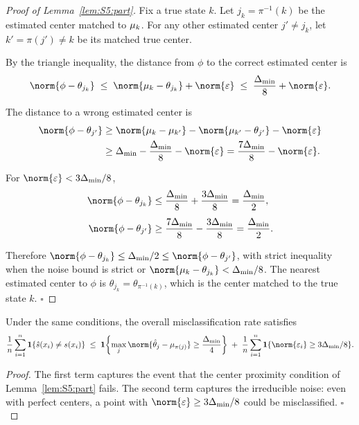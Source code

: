 \begin{proof}[Proof of Lemma~\ref{lem:S5:part}]
Fix a true state $k$.  Let $j_k=\pi^{-1}(k)$ be the estimated center
matched to $\mu_k$.  For any other estimated center $j'\neq j_k$, let
$k'=\pi(j')\neq k$ be its matched true center.

By the triangle inequality, the distance from $\phi$ to the correct
estimated center is
\[
\norm{\phi-\theta_{j_k}}
\;\le\; \norm{\muk-\theta_{j_k}} + \norm{\varepsilon}
\;\le\; \frac{\Delta_{\min}}{8} + \norm{\varepsilon}.
\]

The distance to a wrong estimated center is
\begin{align*}
\norm{\phi-\theta_{j'}}
&\ge \norm{\muk-\mu_{k'}} - \norm{\mu_{k'}-\theta_{j'}} - \norm{\varepsilon} \\
&\ge \Delta_{\min} - \frac{\Delta_{\min}}{8} - \norm{\varepsilon}
= \frac{7\Delta_{\min}}{8} - \norm{\varepsilon}.
\end{align*}

For $\norm{\varepsilon}<3\Delta_{\min}/8$,
\begin{align*}
\norm{\phi-\theta_{j_k}}
&\le \frac{\Delta_{\min}}{8} + \frac{3\Delta_{\min}}{8}
= \frac{\Delta_{\min}}{2}, \\[4pt]
\norm{\phi-\theta_{j'}}
&\ge \frac{7\Delta_{\min}}{8} - \frac{3\Delta_{\min}}{8}
= \frac{\Delta_{\min}}{2}.
\end{align*}

Therefore $\norm{\phi-\theta_{j_k}}\le\Delta_{\min}/2\le
\norm{\phi-\theta_{j'}}$, with strict inequality when the noise bound
is strict or $\norm{\muk-\theta_{j_k}}<\Delta_{\min}/8$.  The nearest
estimated center to $\phi$ is $\theta_{j_k}=\theta_{\pi^{-1}(k)}$, which
is the center matched to the true state $k$.  \hfill$\square$
\end{proof}

\begin{corollary}
\label{cor:S5:misc}
Under the same conditions, the overall misclassification rate satisfies
\[
\frac1n\sum_{i=1}^n\ind\{\hat s(x_i)\neq s(x_i)\}
\;\le\; \ind\!\left\{\max_j\norm{\hat\theta_j-\mu_{\pi(j)}}
                \ge\frac{\Delta_{\min}}{4}\right\}
\;+\; \frac1n\sum_{i=1}^n\ind\{\norm{\varepsilon_i}\ge3\Delta_{\min}/8\}.
\]
\end{corollary}

\begin{proof}
The first term captures the event that the center proximity condition of
Lemma~\ref{lem:S5:part} fails.  The second term captures the irreducible
noise: even with perfect centers, a point with
$\norm{\varepsilon}\ge3\Delta_{\min}/8$ could be misclassified. \hfill$\square$
\end{proof}


